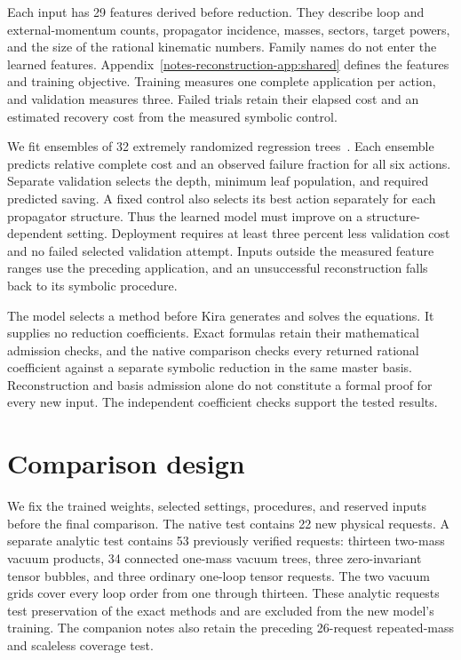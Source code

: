 \documentclass[11pt,a4paper]{article}
\begin{document}
Each input has 29 features derived before reduction. They describe loop and external-momentum counts, propagator incidence, masses, sectors, target powers, and the size of the rational kinematic numbers. Family names do not enter the learned features. Appendix~\ref{notes-reconstruction-app:shared} defines the features and training objective. Training measures one complete application per action, and validation measures three. Failed trials retain their elapsed cost and an estimated recovery cost from the measured symbolic control.

We fit ensembles of 32 extremely randomized regression trees~\cite{Geurts2006ExtraTrees}. Each ensemble predicts relative complete cost and an observed failure fraction for all six actions. Separate validation selects the depth, minimum leaf population, and required predicted saving. A fixed control also selects its best action separately for each propagator structure. Thus the learned model must improve on a structure-dependent setting. Deployment requires at least three percent less validation cost and no failed selected validation attempt. Inputs outside the measured feature ranges use the preceding application, and an unsuccessful reconstruction falls back to its symbolic procedure.

The model selects a method before Kira generates and solves the equations. It supplies no reduction coefficients. Exact formulas retain their mathematical admission checks, and the native comparison checks every returned rational coefficient against a separate symbolic reduction in the same master basis. Reconstruction and basis admission alone do not constitute a formal proof for every new input. The independent coefficient checks support the tested results.


\section{Comparison design}
\label{notes-reconstruction-sec:design}
We fix the trained weights, selected settings, procedures, and reserved inputs before the final comparison. The native test contains 22 new physical requests. A separate analytic test contains 53 previously verified requests: thirteen two-mass vacuum products, 34 connected one-mass vacuum trees, three zero-invariant tensor bubbles, and three ordinary one-loop tensor requests. The two vacuum grids cover every loop order from one through thirteen. These analytic requests test preservation of the exact methods and are excluded from the new model's training. The companion notes also retain the preceding 26-request repeated-mass and scaleless coverage test.
\end{document}
